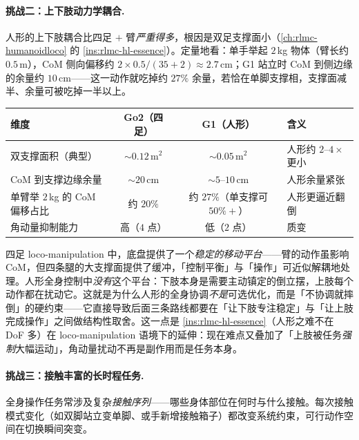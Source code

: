 \paragraph{挑战二：上下肢动力学耦合.}
人形的上下肢耦合比四足 $+$ 臂\emph{严重得多}，根因是双足支撑面小（\cref{ch:rlmc-humanoidloco} 的 \cref{ins:rlmc-hl-essence}）。定量地看：单手举起 $2$\,kg 物体（臂长约 $0.5$\,m），CoM 侧向偏移约 $2\times0.5/(35+2)\approx 2.7$\,cm；G1 站立时 CoM 到侧边缘的余量约 $10$\,cm——这一动作就吃掉约 $27\%$ 余量，若恰在单脚支撑相，支撑面减半、余量可被吃掉一半以上。

\begin{center}
\small
\begin{tabular}{lccl}
\hline
维度 & Go2（四足） & G1（人形） & 含义 \\
\hline
双支撑面积（典型） & $\sim 0.12\,\mathrm{m}^2$ & $\sim 0.05\,\mathrm{m}^2$ & 人形约 $2$--$4\times$ 更小 \\
CoM 到支撑边缘余量 & $\sim 20$\,cm & $\sim 5$--$10$\,cm & 人形余量紧张 \\
单臂举 $2$\,kg 的 CoM 偏移占比 & 约 $20\%$ & 约 $27\%$（单支撑可 $50\%+$） & 人形更逼近翻倒 \\
角动量抑制能力 & 高（$4$ 点） & 低（$2$ 点） & 质变 \\
\hline
\end{tabular}
\end{center}

\begin{insight}\label{ins:rlmc-wbc-platform}
四足 loco-manipulation 中，底盘提供了一个\emph{稳定的移动平台}——臂的动作虽影响 CoM，但四条腿的大支撑面提供了缓冲，「控制平衡」与「操作」可近似解耦地处理。人形全身控制中\emph{没有}这个平台：下肢本身是需要主动镇定的倒立摆，上肢每个动作都在扰动它。这就是为什么人形的全身协调\emph{不是}可选优化，而是「不协调就摔倒」的硬约束——它直接导致后面三条路线都要在「让下肢专注稳定」与「让上肢完成操作」之间做结构性取舍。这一点是 \cref{ins:rlmc-hl-essence}（人形之难不在 DoF 多）在 loco-manipulation 语境下的延伸：现在难点又叠加了「上肢被任务\emph{强制}大幅运动」，角动量扰动不再是副作用而是任务本身。
\end{insight}

\paragraph{挑战三：接触丰富的长时程任务.}
全身操作任务常涉及复杂\emph{接触序列}——哪些身体部位在何时与什么接触。每次接触模式变化（如双脚站立变单脚、或手新增接触箱子）都改变系统约束，可行动作空间在切换瞬间突变。

